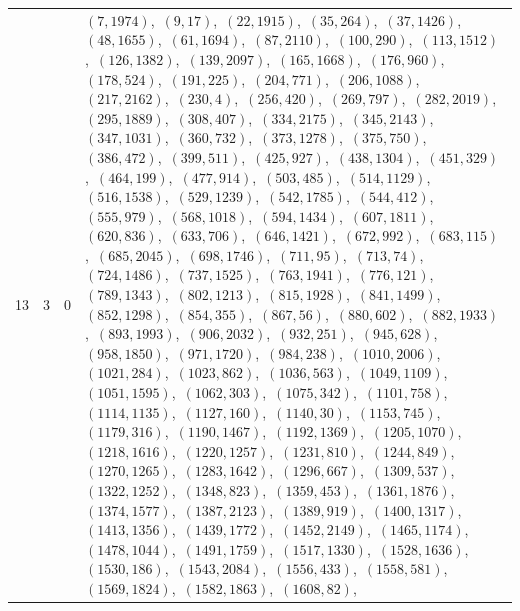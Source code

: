 \documentclass[11pt]{article}
\begin{document}
\begin{longtable}{@{}rrl>{\raggedright\arraybackslash}p{}@{}}
13 & 3 & $0$ & $(7,1974)$,\allowbreak\ $(9,17)$,\allowbreak\ $(22,1915)$,\allowbreak\ $(35,264)$,\allowbreak\ $(37,1426)$,\allowbreak\ $(48,1655)$,\allowbreak\ $(61,1694)$,\allowbreak\ $(87,2110)$,\allowbreak\ $(100,290)$,\allowbreak\ $(113,1512)$,\allowbreak\ $(126,1382)$,\allowbreak\ $(139,2097)$,\allowbreak\ $(165,1668)$,\allowbreak\ $(176,960)$,\allowbreak\ $(178,524)$,\allowbreak\ $(191,225)$,\allowbreak\ $(204,771)$,\allowbreak\ $(206,1088)$,\allowbreak\ $(217,2162)$,\allowbreak\ $(230,4)$,\allowbreak\ $(256,420)$,\allowbreak\ $(269,797)$,\allowbreak\ $(282,2019)$,\allowbreak\ $(295,1889)$,\allowbreak\ $(308,407)$,\allowbreak\ $(334,2175)$,\allowbreak\ $(345,2143)$,\allowbreak\ $(347,1031)$,\allowbreak\ $(360,732)$,\allowbreak\ $(373,1278)$,\allowbreak\ $(375,750)$,\allowbreak\ $(386,472)$,\allowbreak\ $(399,511)$,\allowbreak\ $(425,927)$,\allowbreak\ $(438,1304)$,\allowbreak\ $(451,329)$,\allowbreak\ $(464,199)$,\allowbreak\ $(477,914)$,\allowbreak\ $(503,485)$,\allowbreak\ $(514,1129)$,\allowbreak\ $(516,1538)$,\allowbreak\ $(529,1239)$,\allowbreak\ $(542,1785)$,\allowbreak\ $(544,412)$,\allowbreak\ $(555,979)$,\allowbreak\ $(568,1018)$,\allowbreak\ $(594,1434)$,\allowbreak\ $(607,1811)$,\allowbreak\ $(620,836)$,\allowbreak\ $(633,706)$,\allowbreak\ $(646,1421)$,\allowbreak\ $(672,992)$,\allowbreak\ $(683,115)$,\allowbreak\ $(685,2045)$,\allowbreak\ $(698,1746)$,\allowbreak\ $(711,95)$,\allowbreak\ $(713,74)$,\allowbreak\ $(724,1486)$,\allowbreak\ $(737,1525)$,\allowbreak\ $(763,1941)$,\allowbreak\ $(776,121)$,\allowbreak\ $(789,1343)$,\allowbreak\ $(802,1213)$,\allowbreak\ $(815,1928)$,\allowbreak\ $(841,1499)$,\allowbreak\ $(852,1298)$,\allowbreak\ $(854,355)$,\allowbreak\ $(867,56)$,\allowbreak\ $(880,602)$,\allowbreak\ $(882,1933)$,\allowbreak\ $(893,1993)$,\allowbreak\ $(906,2032)$,\allowbreak\ $(932,251)$,\allowbreak\ $(945,628)$,\allowbreak\ $(958,1850)$,\allowbreak\ $(971,1720)$,\allowbreak\ $(984,238)$,\allowbreak\ $(1010,2006)$,\allowbreak\ $(1021,284)$,\allowbreak\ $(1023,862)$,\allowbreak\ $(1036,563)$,\allowbreak\ $(1049,1109)$,\allowbreak\ $(1051,1595)$,\allowbreak\ $(1062,303)$,\allowbreak\ $(1075,342)$,\allowbreak\ $(1101,758)$,\allowbreak\ $(1114,1135)$,\allowbreak\ $(1127,160)$,\allowbreak\ $(1140,30)$,\allowbreak\ $(1153,745)$,\allowbreak\ $(1179,316)$,\allowbreak\ $(1190,1467)$,\allowbreak\ $(1192,1369)$,\allowbreak\ $(1205,1070)$,\allowbreak\ $(1218,1616)$,\allowbreak\ $(1220,1257)$,\allowbreak\ $(1231,810)$,\allowbreak\ $(1244,849)$,\allowbreak\ $(1270,1265)$,\allowbreak\ $(1283,1642)$,\allowbreak\ $(1296,667)$,\allowbreak\ $(1309,537)$,\allowbreak\ $(1322,1252)$,\allowbreak\ $(1348,823)$,\allowbreak\ $(1359,453)$,\allowbreak\ $(1361,1876)$,\allowbreak\ $(1374,1577)$,\allowbreak\ $(1387,2123)$,\allowbreak\ $(1389,919)$,\allowbreak\ $(1400,1317)$,\allowbreak\ $(1413,1356)$,\allowbreak\ $(1439,1772)$,\allowbreak\ $(1452,2149)$,\allowbreak\ $(1465,1174)$,\allowbreak\ $(1478,1044)$,\allowbreak\ $(1491,1759)$,\allowbreak\ $(1517,1330)$,\allowbreak\ $(1528,1636)$,\allowbreak\ $(1530,186)$,\allowbreak\ $(1543,2084)$,\allowbreak\ $(1556,433)$,\allowbreak\ $(1558,581)$,\allowbreak\ $(1569,1824)$,\allowbreak\ $(1582,1863)$,\allowbreak\ $(1608,82)$,\allowbreak\ 
\end{longtable}
\end{document}
